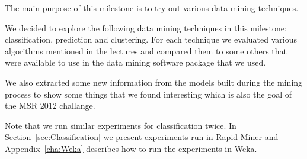 The main purpose of this milestone is to try out various data mining techniques.

We decided to explore the following data mining techniques in this milestone: classification, prediction and clustering. For each technique we evaluated various algorithms mentioned in the lectures and compared them to some others that were available to use in the data mining software package that we used. 

We also extracted some new information from the models built during the mining process to show some things that we found interesting which is also the goal of the MSR 2012 challange.

Note that we run similar experiments for classification twice. In Section~\ref{sec:Classification} we present experiments run in Rapid Miner and Appendix~\ref{cha:Weka} describes how to run the experiments in Weka.

